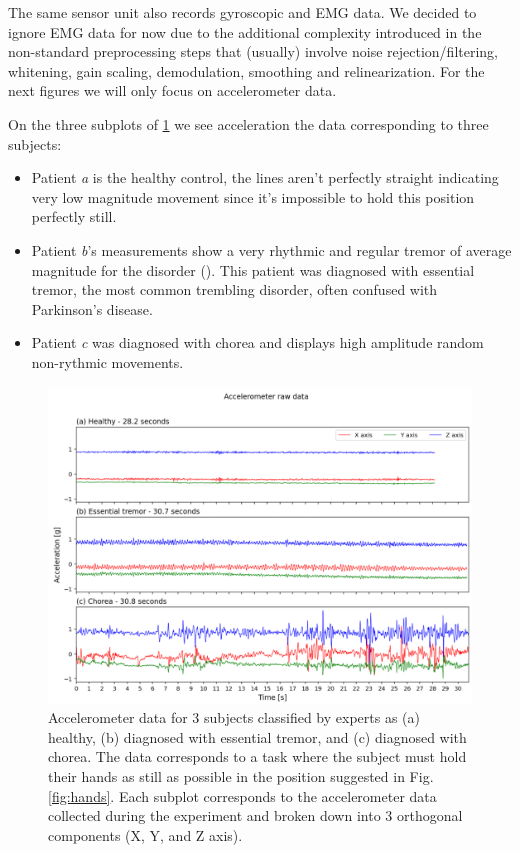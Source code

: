 The same sensor unit also records gyroscopic and EMG data. We decided to ignore EMG data for now due to the additional complexity introduced in the non-standard preprocessing steps that (usually) involve noise rejection/filtering, whitening, gain scaling, demodulation, smoothing and relinearization. For the next figures we will only focus on accelerometer data.


On the three subplots of \cref{fig:acc} we see acceleration the data corresponding to three subjects: 
\begin{itemize}
    \item Patient \textit{a} is the healthy control, the lines aren't perfectly straight indicating very low magnitude movement since it's impossible to hold this position perfectly still.
    \item Patient \textit{b}'s measurements show a very rhythmic and regular tremor of average magnitude for the disorder (). This patient was diagnosed with essential tremor, the most common trembling disorder, often confused with Parkinson's disease.
    \item Patient \textit{c} was diagnosed with chorea and displays high amplitude random non-rythmic movements. 
\end{itemize}
 

\begin{figure}[ht]
\centering
\includegraphics[width=\linewidth]{figures/nemo/acc2.png}
\caption{Accelerometer data for 3 subjects classified by experts as (a) healthy, (b) diagnosed with essential tremor, and (c) diagnosed with chorea. The data corresponds to a task where the subject must hold their hands as still as possible in the position suggested in Fig. \ref{fig:hands}.
Each subplot corresponds to the accelerometer data collected during the experiment and broken down into 3 orthogonal components (X, Y, and Z axis). }
\label{fig:acc}
\end{figure}


